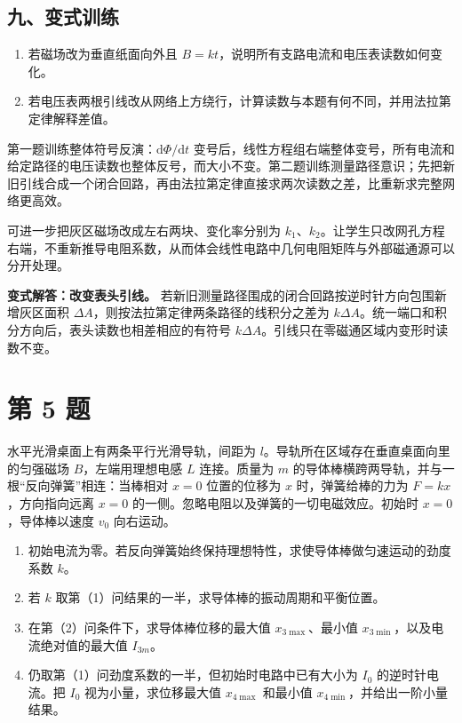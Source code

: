 \documentclass[12pt,a4paper,UTF8]{ctexart}
\newcommand{\tightlist}{\setlength{\itemsep}{0pt}\setlength{\parskip}{0pt}}
\begin{document}
\subsection{九、变式训练}\label{ux4e5dux53d8ux5f0fux8badux7ec3-3}

\begin{enumerate}
\def\labelenumi{\arabic{enumi}.}
\tightlist
\item
  若磁场改为垂直纸面向外且
  \(B=kt\)，说明所有支路电流和电压表读数如何变化。
\item
  若电压表两根引线改从网络上方绕行，计算读数与本题有何不同，并用法拉第定律解释差值。
\end{enumerate}

第一题训练整体符号反演：\(\mathrm d\Phi/\mathrm dt\)
变号后，线性方程组右端整体变号，所有电流和给定路径的电压读数也整体反号，而大小不变。第二题训练测量路径意识；先把新旧引线合成一个闭合回路，再由法拉第定律直接求两次读数之差，比重新求完整网络更高效。

可进一步把灰区磁场改成左右两块、变化率分别为
\(k_1\)、\(k_2\)。让学生只改网孔方程右端，不重新推导电阻系数，从而体会线性电路中几何电阻矩阵与外部磁通源可以分开处理。

\textbf{变式解答：改变表头引线。}
若新旧测量路径围成的闭合回路按逆时针方向包围新增灰区面积
\(\Delta A\)，则按法拉第定律两条路径的线积分之差为
\(k\Delta A\)。统一端口和积分方向后，表头读数也相差相应的有符号
\(k\Delta A\)。引线只在零磁通区域内变形时读数不变。

\newpage

\section{第 5 题}\label{ux7b2c-5-ux9898}

水平光滑桌面上有两条平行光滑导轨，间距为
\(l\)。导轨所在区域存在垂直桌面向里的匀强磁场 \(B\)，左端用理想电感
\(L\) 连接。质量为 \(m\)
的导体棒横跨两导轨，并与一根``反向弹簧''相连：当棒相对 \(x=0\)
位置的位移为 \(x\) 时，弹簧给棒的力为 \(F=kx\)，方向指向远离 \(x=0\)
的一侧。忽略电阻以及弹簧的一切电磁效应。初始时 \(x=0\)，导体棒以速度
\(v_0\) 向右运动。

\begin{enumerate}
\def\labelenumi{\arabic{enumi}.}
\tightlist
\item
  初始电流为零。若反向弹簧始终保持理想特性，求使导体棒做匀速运动的劲度系数
  \(k\)。
\item
  若 \(k\) 取第（1）问结果的一半，求导体棒的振动周期和平衡位置。
\item
  在第（2）问条件下，求导体棒位移的最大值 \(x_{3\max}\)、最小值
  \(x_{3\min}\)，以及电流绝对值的最大值 \(I_{3m}\)。
\item
  仍取第（1）问劲度系数的一半，但初始时电路中已有大小为 \(I_0\)
  的逆时针电流。把 \(I_0\) 视为小量，求位移最大值 \(x_{4\max}\) 和最小值
  \(x_{4\min}\)，并给出一阶小量结果。
\end{enumerate}
\end{document}
